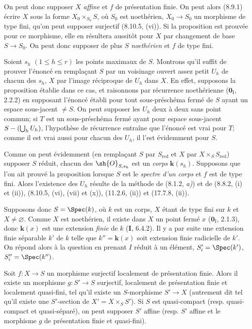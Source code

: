 On peut donc supposer $X$ \emph{affine} et $f$ de présentation finie. On peut alors (8.9.1) écrire $X$ sous la forme $X_0\times_{S_0}S$, où $S_0$ est noethérien, $X_0\to S_0$ un morphisme de type fini, qu'on peut supposer surjectif (8.10.5, (vi)). Si la proposition est prouvée pour ce morphisme, elle en résultera aussitôt pour $X$ par changement de base $S\to S_0$. On peut donc supposer de plus $S$ \emph{noethérien} et $f$ de type fini.

Soient $s_h$ $(1\leq h\leq r)$ les points maximaux de $S$. Montrons qu'il suffit de prouver l'énoncé en remplaçant $S$ par un voisinage ouvert assez petit $U_h$ de chacun des $s_h$, $X$ par l'image réciproque de $U_h$ dans $X$. En effet, supposons la proposition établie dans ce cas, et raisonnons par récurrence noethérienne ($\mathbf{0}_{\mathrm I}$, 2.2.2) en supposant l'énoncé établi pour tout sous-préschéma fermé de $S$ ayant un espace sous-jacent $\neq S$. On peut supposer les $U_h$ deux à deux sans point commun; si $T$ est un sous-préschéma fermé ayant pour espace sous-jacent $S-(\bigcup_h U_h)$, l'hypothèse de récurrence entraîne que l'énoncé est vrai pour $T$; comme il est vrai aussi pour chacun des $U_h$, il l'est évidemment pour $S$.

Comme on peut évidemment (en remplaçant $S$ par $S_{\mathrm{red}}$ et $X$ par $X\times_S S_{\mathrm{red}}$) supposer $S$ réduit, chacun des $\sh{O}_{S,s_h}$ est un \emph{corps} $\boldsymbol{k}(s_h)$. Supposons que l'on ait prouvé la proposition lorsque $S$ est le \emph{spectre d'un corps} et $f$ est de type fini. Alors l'existence des $U_h$ résulte de la méthode de (8.1.2, \emph{a)}) et de (8.8.2, (i) et (ii)), (8.10.5, (vi), (vii) et (x)), (11.2.6, (ii)) et (17.7.8, (ii)).

Supposons donc $S=\Spec(k)$, où $k$ est un corps, $X$ étant de type fini sur $k$ et $X\neq\varnothing$. Comme $X$ est noethérien, il existe dans $X$ un point fermé $x$ ($\mathbf{0}_{\mathrm I}$, 2.1.3), donc $\boldsymbol{k}(x)$ est une extension \emph{finie} de $k$ (\textbf{I}, 6.4.2). Il y a par suite une extension finie séparable $k'$ de $k$ telle que $k''=\boldsymbol{k}(x)$ soit extension finie radicielle de $k'$. On répond alors à la question en prenant $I$ réduit à un élément, $S_i'=\Spec(k')$, $S_i''=\Spec(k'')$.


\begin{corollary}[17.16.5]
\label{IV.17.16.5}
Soit $f:X\to S$ un morphisme surjectif localement de présentation finie. Alors il existe un morphisme $g:S'\to S$ surjectif, localement de présentation finie et \textup{localement quasi-fini}, tel qu'il existe un $S$-morphisme $S'\to X$ \textup{(autrement dit tel qu'il existe une} $S'$-section \textup{de} $X'=X\times_S S'$\textup{)}. Si $S$ est quasi-compact \textup{(resp.} quasi-compact et quasi-séparé\textup{)}, on peut supposer $S'$ affine \textup{(resp.} $S'$ affine et le morphisme $g$ de présentation finie et quasi-fini\textup{)}.
\end{corollary}

